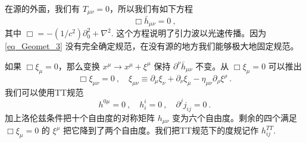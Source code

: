 
\begin{issues}
\issueNeedCite
\issueMissDepend
\end{issues}

在源的外面，我们有 $T_{\mu\nu} = 0$，所以我们有如下方程
\begin{equation}\label{eq_TTGaug_1}
\Box \bar h_{\mu\nu} = 0 ~,
\end{equation}
其中 $\Box = - (1/c^2) \partial_0^2 +\nabla^2$. 这个方程说明了引力波以光速传播。因为\autoref{eq_Geomet_3}  没有完全确定规范，在没有源的地方我们能够极大地固定规范。

如果 $\Box \xi_\mu = 0$，那么变换 $x^\mu \rightarrow x^\mu+\xi^\mu$ 保持 $\partial^\nu \bar h_{\mu\nu}$ 不变。从 $\Box \xi_\mu = 0$ 可以推出
\begin{equation}
\Box \xi_{\mu\nu} = 0~, \quad \xi_{\mu\nu} \equiv \partial_{\mu} \xi_\nu +\partial_\nu \xi_\mu - \eta_{\mu\nu} \partial_\rho\xi^\rho~. 
\end{equation}
我们可以使用TT规范
\begin{equation}
h^{0\mu} = 0~, \quad h^i_i = 0~, \quad \partial^j j_{ij} = 0~.
\end{equation}
加上洛伦兹条件把十个自由度的对称矩阵 $h_{\mu\nu}$ 变为六个自由度。剩余的四个满足 $\Box \xi_\mu = 0$ 的 $\xi^\mu$ 把它降到了两个自由度。我们把TT规范下的度规记作 $h_{ij}^{TT}$. 

